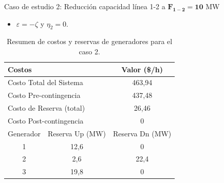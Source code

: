\begin{frame}{Caso de estudio 2: Reducción capacidad línea 1-2 a $\mathbf{F_{1-2}=10}$ MW}
\begin{itemize}
    \item $\varepsilon=-\zeta$ y $\eta_{2} = 0$.
\end{itemize}
\small
\begin{table}[H]
		\renewcommand{\arraystretch}{1.3}
		\centering
		\caption{Resumen de costos y reservas de generadores para el caso 2.}
		\label{tab:res_ctos_caso2}
		\begin{tabular}{|c|c|c|}
			\hline
			\multicolumn{2}{|l|}{Costos} & Valor (\$/h) \\
			\hline
			\multicolumn{2}{|l|}{Costo Total del Sistema} & 463,94 \\
			\multicolumn{2}{|l|}{Costo Pre-contingencia} & 437,48 \\
			\multicolumn{2}{|l|}{Costo de Reserva (total)} & 26,46 \\
			\multicolumn{2}{|l|}{Costo Post-contingencia} & 0 \\
			\hline \hline
			Generador & Reserva Up (MW) & Reserva Dn (MW) \\
			\hline
			1 & 12,6 & 0 \\
			2 & 2,6 & 22,4 \\
			3 & 19,8 & 0 \\
			\hline
		\end{tabular}
	\end{table}

\end{frame}
